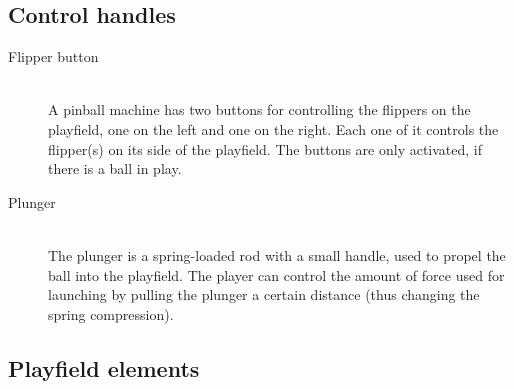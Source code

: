 \documentclass[fontsize=12pt,
               paper=a4,
               twoside=false,
               parskip=half,
               ]{scrartcl}
\begin{document}
\subsection*{Control handles}

\begin{description}

\item[Flipper button] \hfill \\
A pinball machine has two buttons for controlling the flippers on the playfield, one on the left and one on the right. Each one of it controls the flipper(s) on its side of the playfield. The buttons are only activated, if there is a ball in play.

\item[Plunger] \hfill \\
The plunger is a spring-loaded rod with a small handle, used to propel the ball into the playfield. The player can control the amount of force used for launching by pulling the plunger a certain distance (thus changing the spring compression).

\end{description}

\subsection*{Playfield elements}
\end{document}
